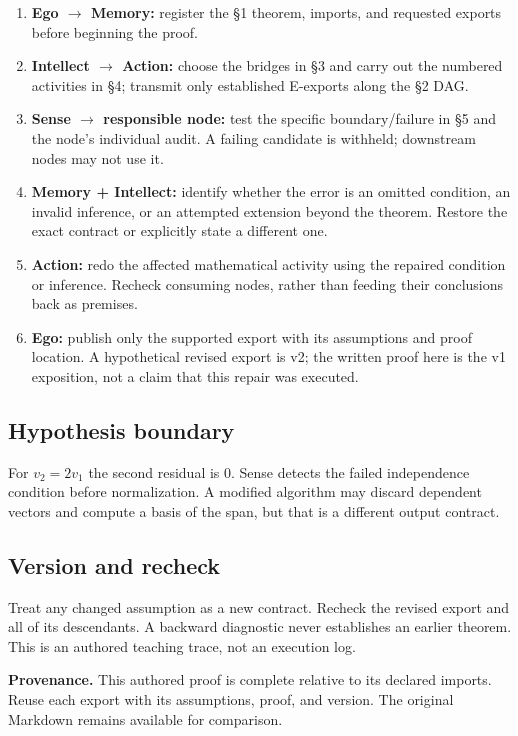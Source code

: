 \documentclass[preprint,12pt,aps,pra,showkeys,amsmath,amssymb,superscriptaddress,floatfix]{revtex4-2}
\theoremstyle{definition}
\theoremstyle{remark}
\providecommand{\tightlist}{\setlength{\itemsep}{2pt}\setlength{\parskip}{0pt}}
\begin{document}
\begin{enumerate}
\def\labelenumi{\arabic{enumi}.}
\tightlist
\item
  \textbf{Ego \(\to\) Memory:} register the §1 theorem, imports, and
  requested exports before beginning the proof.
\item
  \textbf{Intellect \(\to\) Action:} choose the bridges in §3 and carry
  out the numbered activities in §4; transmit only established E-exports
  along the §2 DAG.
\item
  \textbf{Sense \(\to\) responsible node:} test the specific
  boundary/failure in §5 and the node's individual audit. A failing
  candidate is withheld; downstream nodes may not use it.
\item
  \textbf{Memory + Intellect:} identify whether the error is an omitted
  condition, an invalid inference, or an attempted extension beyond the
  theorem. Restore the exact contract or explicitly state a different
  one.
\item
  \textbf{Action:} redo the affected mathematical activity using the
  repaired condition or inference. Recheck consuming nodes, rather than
  feeding their conclusions back as premises.
\item
  \textbf{Ego:} publish only the supported export with its assumptions
  and proof location. A hypothetical revised export is v2; the written
  proof here is the v1 exposition, not a claim that this repair was
  executed.
\end{enumerate}

\subsection{Hypothesis boundary}
For \(v_{2}=2v_{1}\) the second residual is 0. Sense detects the failed
independence condition before normalization. A modified algorithm may
discard dependent vectors and compute a basis of the span, but that is a
different output contract.

\subsection{Version and recheck}
Treat any changed assumption as a new contract. Recheck the revised
export and all of its descendants. A backward diagnostic never
establishes an earlier theorem. This is an authored teaching trace, not
an execution log.

\par\medskip\begingroup\small\linespread{1.0}\selectfont\noindent\textbf{Provenance.} This authored proof is complete relative to its declared imports. Reuse
each export with its assumptions, proof, and version. The original
Markdown remains available for comparison.
\par\endgroup
\end{document}
